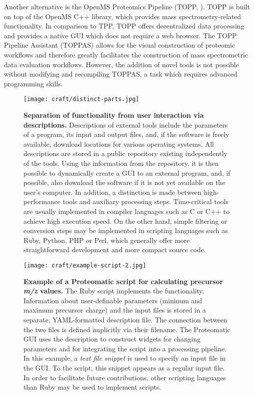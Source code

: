 Another alternative is the OpenMS Proteomics Pipeline (TOPP, 
\cite[]{kohlbacher_topp_2007}).
TOPP is built on top of the OpenMS C++ library, which provides mass 
spectrometry-related functionality. 
In comparison to TPP, TOPP offers decentralized data processing and provides a 
native GUI which does not require a web browser. 
The TOPP Pipeline Assistant (TOPPAS) allows for the visual construction of 
proteomic workflows and therefore greatly facilitates the construction of mass 
spectrometric data evaluation workflows.
However, the addition of novel tools is not possible without modifying and 
recompiling TOPPAS, a task which requires advanced programming skills.

\begin{figure}
\texttt{[image: craft/distinct-parts.jpg]}
\caption{
    {\bf Separation of functionality from user interaction via descriptions.}
    Descriptions of external tools include the parameters of a program, its
    input and output files, and, if the software is freely available, download 
    locations for various operating systems.
    All descriptions are stored in a public repository existing independently of 
    the tools.
    Using the information from the repository, it is then possible to dynamically create
    a GUI to an external program, and, if possible, also download the software if it is not
    yet available on the user's computer.
    In addition, a distinction is made between high-performance tools and auxiliary
    processing steps. 
    Time-critical tools are usually implemented in compiler languages such as C or
    C++ to achieve high execution speed. 
    On the other hand, simple filtering or conversion steps may be implemented
    in scripting languages such as Ruby, Python, PHP or Perl, which generally
    offer more straightforward development and more compact source code.
}
\label{fig:distinct-parts}
\end{figure}

\begin{figure*}
\texttt{[image: craft/example-script-2.jpg]}
\caption{
    {\bf Example of a Proteomatic script for calculating precursor {\em m/z} 
    values.}
    The Ruby script implements the functionality. 
    Information about user-definable parameters (mininum and maximum precursor charge) 
    and the input files is stored in a separate, YAML-formatted 
    description file. 
    The connection between the two files is defined implicitly via their 
    filename.
    The Proteomatic GUI uses the description to construct widgets for 
    changing parameters and for integrating the script into a processing
    pipeline.
    In this example, a {\em text file snippet} is used to specify an input file
    in the GUI.
    To the script, this snippet appears as a regular input file.
    In order to facilitate future contributions, other scripting languages than 
    Ruby may be used to implement scripts.
}
\label{fig:example-script}
\end{figure*}

